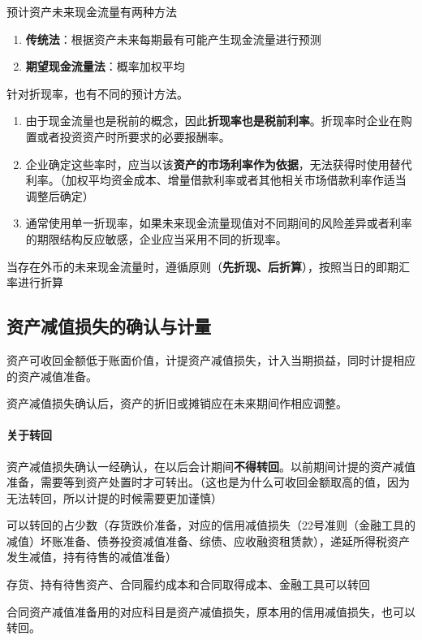 \documentclass[UTF8,12pt]{ctexart}
\numberwithin{equation}{section} %
\numberwithin{figure}{section}
\numberwithin{table}{section}
\begin{document}
	预计资产未来现金流量有两种方法
	\begin{enumerate}
		\item \textbf{传统法}：根据资产未来每期最有可能产生现金流量进行预测
		
		\item \textbf{期望现金流量法}：概率加权平均
	\end{enumerate}
	
	针对折现率，也有不同的预计方法。 
	\begin{enumerate}
		\item 由于现金流量也是税前的概念，因此\textbf{折现率也是税前利率}。折现率时企业在购置或者投资资产时所要求的必要报酬率。
		
		\item 企业确定这些率时，应当以该\textbf{资产的市场利率作为依据}，无法获得时使用替代利率。（加权平均资金成本、增量借款利率或者其他相关市场借款利率作适当调整后确定）
		
		\item 通常使用单一折现率，如果未来现金流量现值对不同期间的风险差异或者利率的期限结构反应敏感，企业应当采用不同的折现率。 
	\end{enumerate}
	
	当存在外币的未来现金流量时，遵循原则（\textbf{先折现、后折算}），按照当日的即期汇率进行折算
	
	\subsection{资产减值损失的确认与计量}
	资产可收回金额低于账面价值，计提资产减值损失，计入当期损益，同时计提相应的资产减值准备。
	
	资产减值损失确认后，资产的折旧或摊销应在未来期间作相应调整。
	
	\paragraph{关于转回}
	资产减值损失确认一经确认，在以后会计期间\textbf{不得转回}。以前期间计提的资产减值准备，需要等到资产处置时才可转出。（这也是为什么可收回金额取高的值，因为无法转回，所以计提的时候需要更加谨慎）
	
	可以转回的占少数（存货跌价准备，对应的信用减值损失（22号准则（金融工具的减值）坏账准备、债券投资减值准备、综债、应收融资租赁款），递延所得税资产发生减值，持有待售的减值准备）
	
	存货、持有待售资产、合同履约成本和合同取得成本、金融工具可以转回
	
	合同资产减值准备用的对应科目是资产减值损失，原本用的信用减值损失，也可以转回。 
	
\end{document}
